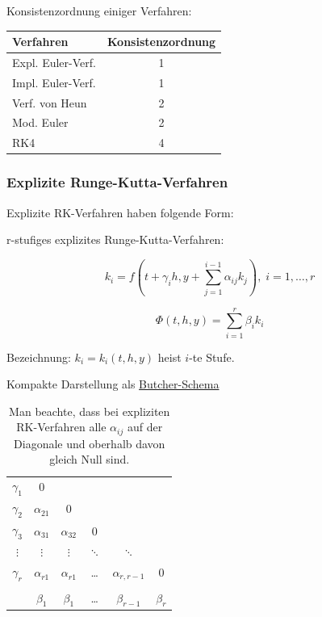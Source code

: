 \documentclass[10pt,a4paper]{article}
\begin{document}
Konsistenzordnung einiger Verfahren:
\begin{table}[H]
\centering
\begin{tabular}{|l c|}
\hline
Verfahren & Konsistenzordnung \\
\hline \hline
Expl. Euler-Verf. & 1 \\
Impl. Euler-Verf. & 1 \\
Verf. von Heun & 2 \\
Mod. Euler & 2\\
RK4 & 4 \\
\hline
\end{tabular}
\end{table}

\subsubsection{Explizite Runge-Kutta-Verfahren}
Explizite RK-Verfahren haben folgende Form:

r-stufiges explizites Runge-Kutta-Verfahren:

\begin{equation}
k_i=f(t+\gamma_i h, y + \sum\limits_{j=1}^{i-1} \alpha_{ij}k_j), \; i=1,\ldots, r
\end{equation}

\begin{equation}
\Phi(t,h,y)=\sum_{i=1}^{r} \beta_i k_i
\end{equation}


Bezeichnung: $k_i=k_i(t,h,y)$ heist $i$-te Stufe.

Kompakte Darstellung als \underline{ Butcher-Schema}

\begin{table}[H]
\centering
\begin{tabular}{c| c c c c c}
$\gamma_1$ & 0 \\
$\gamma_2$ & $\alpha_{21}$ & 0 \\
$\gamma_3$ & $\alpha_{31}$ & $\alpha_{32}$ & 0\\
$\vdots$ & $\vdots$ & $\vdots$ & $\ddots$ & $\ddots$ \\
$\gamma_r$ & $\alpha_{r1}$ & $\alpha_{r1}$ & \ldots & $\alpha_{r,r-1}$ & 0 \\
\hline \\
 & $\beta_1$ & $\beta_1$ & \ldots & $\beta_{r-1}$ & $\beta_r$
\end{tabular}
\caption{Man beachte, dass bei expliziten RK-Verfahren alle $\alpha_{ij}$ auf der Diagonale und oberhalb davon gleich Null sind.}
\label{tab:ExplicitRkButscherScheme}
\end{table}
\end{document}
